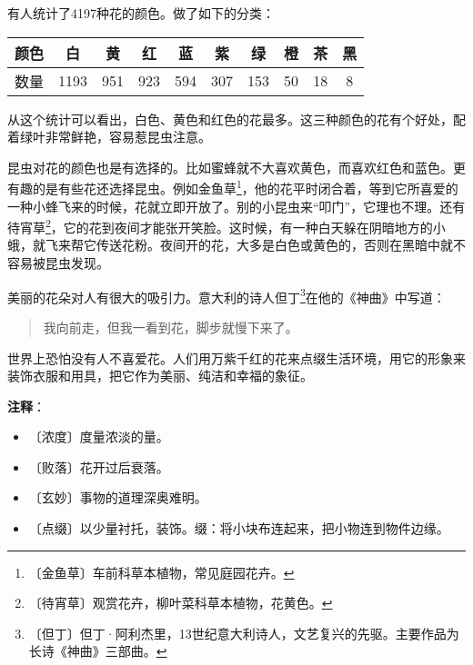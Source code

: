 \documentclass[12pt,UTF-8,openany]{ctexbook}
\begin{document}
\begin{large}
    有人统计了4197种花的颜色。做了如下的分类：
    
    \begin{center}\begin{tabular}{| c | c | c | c | c | c | c | c | c | c |}
    
    \hline
    
    颜色 & 白 & 黄 & 红 & 蓝 & 紫 & 绿 & 橙 & 茶 & 黑 \\
    
    \hline
    
    数量 & 1193 & 951 & 923 & 594 & 307 & 153 & 50 & 18 & 8 \\
    
    \hline
    
    \end{tabular}\end{center}
    
    从这个统计可以看出，白色、黄色和红色的花最多。这三种颜色的花有个好处，配着绿叶非常鲜艳，容易惹昆虫注意。
    
    昆虫对花的颜色也是有选择的。比如蜜蜂就不大喜欢黄色，而喜欢红色和蓝色。更有趣的是有些花还选择昆虫。例如金鱼草\footnote{〔金鱼草〕车前科草本植物，常见庭园花卉。}，他的花平时闭合着，等到它所喜爱的一种小蜂飞来的时候，花就立即开放了。别的小昆虫来“叩门”，它理也不理。还有待宵草\footnote{〔待宵草〕观赏花卉，柳叶菜科草本植物，花黄色。}，它的花到夜间才能张开笑脸。这时候，有一种白天躲在阴暗地方的小蛾，就飞来帮它传送花粉。夜间开的花，大多是白色或黄色的，否则在黑暗中就不容易被昆虫发现。
    
    美丽的花朵对人有很大的吸引力。意大利的诗人但丁\footnote{〔但丁〕但丁·阿利杰里，13世纪意大利诗人，文艺复兴的先驱。主要作品为长诗《神曲》三部曲。}在他的《神曲》中写道：
    
    \begin{quotation}
    
    我向前走，但我一看到花，脚步就慢下来了。
    
    \end{quotation}
    
    世界上恐怕没有人不喜爱花。人们用万紫千红的花来点缀生活环境，用它的形象来装饰衣服和用具，把它作为美丽、纯洁和幸福的象征。
    
\end{large}


\newpage

\textbf{注释}：

\vspace{-1em}

\begin{itemize}
    \setlength\itemsep{-0.2em}
    \item 〔浓度〕度量浓淡的量。
    \item 〔败落〕花开过后衰落。
    \item 〔玄妙〕事物的道理深奥难明。
    \item 〔点缀〕以少量衬托，装饰。缀：将小块布连起来，把小物连到物件边缘。
\end{itemize}
\end{document}
